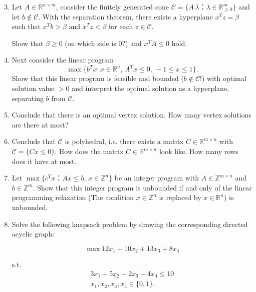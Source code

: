 \documentclass[11pt,a4paper]{article}
\begin{document}
\begin{enumerate}
  \setcounter{enumi}{2}
\item Let $A ∈ ℝ^{n ×m}$, consider the finitely generated cone $\mathscr{C} = \{ A\,  λ ： λ ∈ ℝ^m_{≥0}\}$ and let $b ∉ \mathscr{C} $. With the separation theorem, there exists a hyperplane $x^T z = β$ such that $x^T b > β$ and $x^T z < β$ for each $z ∈  \mathscr{C}$.

  Show that $β≥0$ (on which side is $0$?)  and  $x^T A ≤ 0$ hold.

\item Next consider the linear program
  \begin{displaymath}
     \max\{ b^T x : x ∈ ℝ^n, \,  A^T x ≤ 0, \,  -1 ≤ x ≤ 1\}. 
   \end{displaymath}
   Show that this linear program is feasible and bounded ($b ∉ \mathscr{C}$!) with optimal solution value $>0$ and interpret the optimal solution as a hyperplane, separating $b$ from $\mathscr{C}$. 
 \item Conclude that there is an optimal vertex solution. How many vertex solutions are there at most?
 \item Conclude that $ \mathscr{C}$ is polyhedral, i.e. there exists a matrix $C ∈ ℝ^{m ×n}$ with $\mathscr{C} = \{ Cx ≤0\}$. How does the matrix $C ∈ ℝ^{m ×n}$ look like. How many rows does it have at most. 
   
 \end{enumerate}


\begin{enumerate}
  \setcounter{enumi}{6}
\item Let $\max\{c^Tx ： Ax ≤ b, \, x ∈ ℤ^n\}$ be an integer program with $A ∈ℤ^{m × n }$ and $b ∈ℤ^m$. Show that this integer program is unbounded if and only of the linear programming relaxation (The condition $x ∈ ℤ^n$ is replaced by $x ∈ℝ^n$) is unbounded.


\item 
  Solve the following knapsack problem by drawing the corresponding directed acyclic graph:

  \begin{displaymath}
    \max 12x_1 + 10 x_2 + 13 x_3 + 8 x_4 
  \end{displaymath}

  s.t.
  \begin{eqnarray*}
    3x_1 + 5 x_2 + 2 x_3 + 4 x_4 ≤ 10\\
    x_1,x_2,x_3,x_4 ∈ \{0,1\}. 
  \end{eqnarray*}
  
\end{enumerate}

%
%


 
\end{document}
